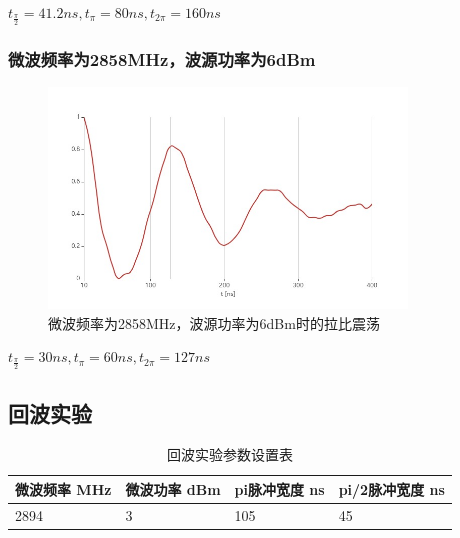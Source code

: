 \documentclass[a4paper,UTF8]{ctexart}
\begin{document}
$t_{\frac{\pi}{2}} = 41.2ns, t_{\pi} = 80ns,t_{2\pi} = 160ns$

\subsubsection{微波频率为2858MHz，波源功率为6dBm}   

\begin{figure}[H]
    \centering
    \begin{minipage}[b]{0.9\textwidth}
        \centering
        \includegraphics[width=0.85\textwidth]{./5.jpeg}
        \caption{微波频率为2858MHz，波源功率为6dBm时的拉比震荡}
    \end{minipage}
\end{figure}

$t_{\frac{\pi}{2}} = 30ns, t_{\pi} = 60ns,t_{2\pi} = 127ns$

\subsection{回波实验}

\begin{table}[H]
    \centering
    \caption{回波实验参数设置表}
    \begin{tabular}{|l|l|l|l|}
    \hline
        微波频率 MHz & 微波功率 dBm & pi脉冲宽度 ns & pi/2脉冲宽度 ns \\ \hline
        2894 & 3 & 105 & 45 \\ \hline
    \end{tabular}
\end{table}
\end{document}
